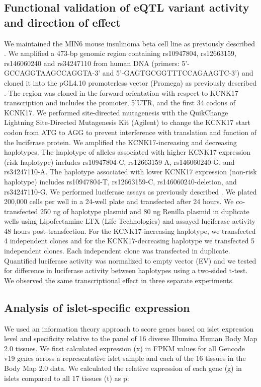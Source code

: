 \subsection{Functional validation of eQTL variant activity and direction of effect}
We maintained the MIN6 mouse insulinoma beta cell line \cite{miyazakiEstablishmentPancreaticBeta1990} as previously described \cite{kulzerCommonFunctionalRegulatory2014}. We amplified a 473-bp genomic region containing rs10947804, rs12663159, rs146060240 and rs34247110 from human DNA (primers: 5'-GCCAGGTAAGCCAGGTA-3' and 5'-GAGTGCGGTTTCCAGAAGTC-3') and cloned it into the pGL4.10 promoterless vector (Promega) as previously described \cite{kulzerCommonFunctionalRegulatory2014}. The region was cloned in the forward orientation with respect to KCNK17 transcription and includes the promoter, 5’UTR, and the first 34 codons of KCNK17. We performed site-directed mutagenesis with the QuikChange Lightning Site-Directed Mutagenesis Kit (Agilent) to change the KCNK17 start codon from ATG to AGG to prevent interference with translation and function of the luciferase protein. We amplified the KCNK17-increasing and decreasing haplotypes. The haplotype of alleles associated with higher KCNK17 expression (risk haplotype) includes rs10947804-C, rs12663159-A, rs146060240-G, and rs34247110-A. The haplotype associated with lower KCNK17 expression (non-risk haplotype) includes rs10947804-T, rs12663159-C, rs146060240-deletion, and rs34247110-G. We performed luciferase assays as previously described \cite{kulzerCommonFunctionalRegulatory2014}. We plated 200,000 cells per well in a 24-well plate and transfected after 24 hours. We co-transfected 250 ng of haplotype plasmid and 80 ng Renilla plasmid in duplicate wells using Lipofectamine LTX (Life Technologies) and assayed luciferase activity 48 hours post-transfection. For the KCNK17-increasing haplotype, we transfected 4 independent clones and for the KCNK17-decreasing haplotype we transfected 5 independent clones. Each independent clone was transfected in duplicate. Quantified luciferase activity was normalized to empty vector (EV) and we tested for difference in luciferase activity between haplotypes using a two-sided t-test. We observed the same transcriptional effect in three separate experiments. 

\subsection{Analysis of islet-specific expression}
We used an information theory approach \cite{schugPromoterFeaturesRelated2005, heGlobalViewEnhancer2014} to score genes based on islet expression level and specificity relative to the panel of 16 diverse Illumina Human Body Map 2.0 tissues. We first calculated expression (x) in FPKM values for all Gencode v19 genes across a representative islet sample and each of the 16 tissues in the Body Map 2.0 data. We calculated the relative expression of each gene (g) in islets compared to all 17 tissues (t) as p:

